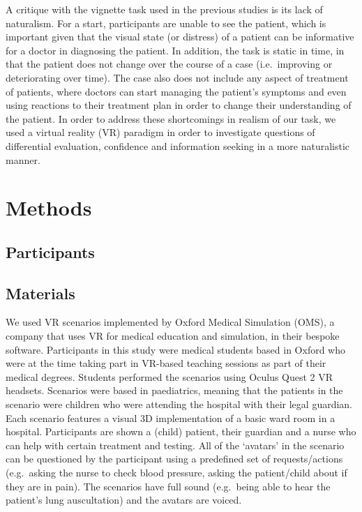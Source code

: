 \documentclass[a4paper, nobind]{templates/ociamthesis}
\begin{document}
\adjustmtc
{}

A critique with the vignette task used in the previous studies is its lack of naturalism. For a start, participants are unable to see the patient, which is important given that the visual state (or distress) of a patient can be informative for a doctor in diagnosing the patient. In addition, the task is static in time, in that the patient does not change over the course of a case (i.e.~improving or deteriorating over time). The case also does not include any aspect of treatment of patients, where doctors can start managing the patient's symptoms and even using reactions to their treatment plan in order to change their understanding of the patient. In order to address these shortcomings in realism of our task, we used a virtual reality (VR) paradigm in order to investigate questions of differential evaluation, confidence and information seeking in a more naturalistic manner.

\hypertarget{methods-2}{%
\section*{Methods}\label{methods-2}}

\hypertarget{participants-2}{%
\subsection*{Participants}\label{participants-2}}

\hypertarget{materials-2}{%
\subsection*{Materials}\label{materials-2}}

We used VR scenarios implemented by Oxford Medical Simulation (OMS), a company that uses VR for medical education and simulation, in their bespoke software. Participants in this study were medical students based in Oxford who were at the time taking part in VR-based teaching sessions as part of their medical degrees. Students performed the scenarios using Oculus Quest 2 VR headsets. Scenarios were based in paediatrics, meaning that the patients in the scenario were children who were attending the hospital with their legal guardian. Each scenario features a visual 3D implementation of a basic ward room in a hospital. Participants are shown a (child) patient, their guardian and a nurse who can help with certain treatment and testing. All of the `avatars' in the scenario can be questioned by the participant using a predefined set of requests/actions (e.g.~asking the nurse to check blood pressure, asking the patient/child about if they are in pain). The scenarios have full sound (e.g.~being able to hear the patient's lung auscultation) and the avatars are voiced.
\end{document}
